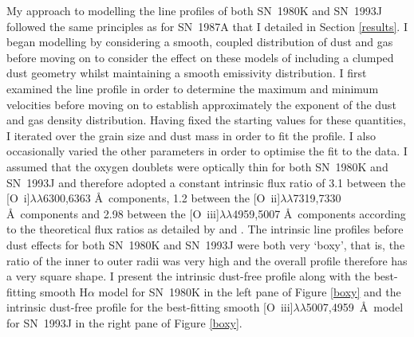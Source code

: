 My approach to modelling the line profiles of both SN~1980K and SN~1993J followed the same principles as for SN~1987A that I detailed in Section \ref{results}.  I began modelling by considering a smooth, coupled distribution of dust and gas before moving on to consider the effect on these models of including a clumped dust geometry whilst maintaining a smooth emissivity distribution.  I first examined the line profile in order to determine the maximum and minimum velocities before moving on to establish approximately the exponent of the dust and gas density distribution.  Having fixed the starting values for these quantities, I iterated over the grain size and dust mass in order to fit the profile.  I also occasionally  varied the other parameters in order to optimise the fit to the data. I assumed that the oxygen doublets were optically thin for both SN~1980K and SN~1993J and therefore adopted a constant intrinsic flux ratio of 3.1 between the [O~{\sc i}]$\lambda\lambda$6300,6363 \AA\  components, 1.2 between the [O~{\sc ii}]$\lambda\lambda$7319,7330 \AA\  components and 2.98 between the [O~{\sc iii}]$\lambda\lambda$4959,5007 \AA\  components according to the theoretical flux ratios as detailed by \citet{Zeippen1987} and \citet{Storey2000}.  The intrinsic line profiles before dust effects for both SN~1980K and SN~1993J were both very `boxy', that is, the ratio of the inner to outer radii was very high and the overall profile therefore has a very square shape.  I present the intrinsic dust-free profile along with the best-fitting smooth H$\alpha$ model for SN~1980K in the left pane of Figure \ref{boxy} and the intrinsic dust-free profile for the best-fitting smooth [O~{\sc iii}]$\lambda\lambda$5007,4959~\AA\ model for SN~1993J in the right pane of Figure \ref{boxy}.

